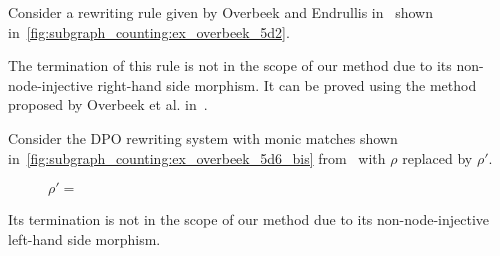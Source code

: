 \begin{example}[Limitation]
    \label{ex:overbeek:5d2:limitation}
    Consider a rewriting rule given by Overbeek and Endrullis in~\cite[Example 5.2]{overbeek2024termination_lmcs} shown in~\autoref{fig:subgraph_counting:ex_overbeek_5d2}.
  \begin{figure}[H]
    \centering
    \caption{}
    \label{fig:subgraph_counting:ex_overbeek_5d2}
  \end{figure}
    The termination of this rule is not in the scope of our method due to its non-node-injective right-hand side morphism. It can be proved using the method proposed by Overbeek et al. in~\cite{overbeek2024termination_lmcs}.
\end{example}
 
\begin{example}[Limitation]
  \label{ex:overbeek:5d6_bis:limitation} 
  Consider the DPO rewriting system with monic matches shown in~\autoref{fig:subgraph_counting:ex_overbeek_5d6_bis} from~\cite[Example 5.6]{overbeek2024termination_lmcs} with $\rho$ replaced by $\rho'$.
  \begin{figure}[H]
    \centering
    $\rho' = $\scalebox{0.9} { }
    \caption{}
    \label{fig:subgraph_counting:ex_overbeek_5d6_bis}
  \end{figure} 
  Its termination is not in the scope of our method due to its non-node-injective left-hand side morphism. 
\end{example}
